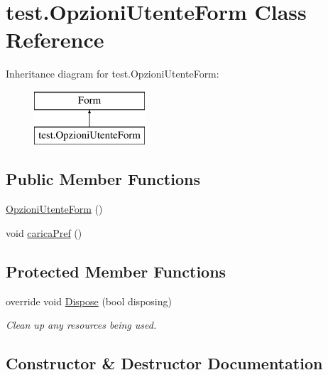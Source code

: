 \hypertarget{classtest_1_1_opzioni_utente_form}{}\section{test.\+Opzioni\+Utente\+Form Class Reference}
\label{classtest_1_1_opzioni_utente_form}
Inheritance diagram for test.\+Opzioni\+Utente\+Form\+:\begin{figure}[H]
\begin{center}
\leavevmode
\includegraphics[height=2.000000cm]{classtest_1_1_opzioni_utente_form}
\end{center}
\end{figure}
\subsection*{Public Member Functions}
\begin{DoxyCompactItemize}
\item 
\hyperlink{classtest_1_1_opzioni_utente_form_a53316a93815f84ebb48bb4638730809c}{Opzioni\+Utente\+Form} ()
\item 
void \hyperlink{classtest_1_1_opzioni_utente_form_ad614275f0bf1d9751dff844ba4c35555}{carica\+Pref} ()
\end{DoxyCompactItemize}
\subsection*{Protected Member Functions}
\begin{DoxyCompactItemize}
\item 
override void \hyperlink{classtest_1_1_opzioni_utente_form_a5aa05f4074cdf20ca0d991c2ff96d06c}{Dispose} (bool disposing)
\begin{DoxyCompactList}\small\item\em Clean up any resources being used. \end{DoxyCompactList}\end{DoxyCompactItemize}


\subsection{Constructor \& Destructor Documentation}
\mbox{\label{classtest_1_1_opzioni_utente_form_a53316a93815f84ebb48bb4638730809c}} 
